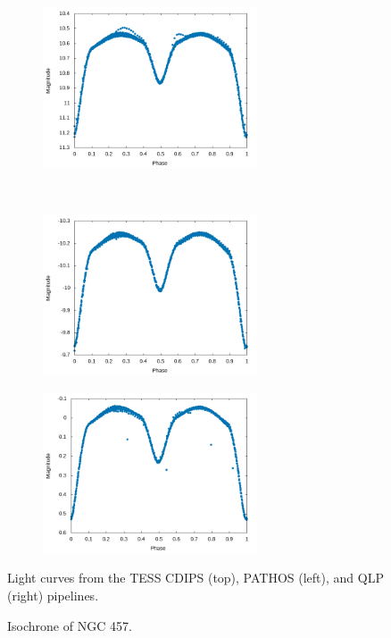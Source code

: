\documentclass[linenumbers]{aastex631}
\begin{document}
\begin{figure}[htb!]
  \centering
  \begin{subfigure}{}
    \includegraphics[width=2.5in]{Figures/V765Cas-TESS-CDIPS-Lightcurve.png}
  \end{subfigure} \\
  \begin{subfigure}{}
    \includegraphics[width=2.5in]{Figures/V765Cas-TESS-PATHOS-Lightcurve.png}
  \end{subfigure}
  \begin{subfigure}{}
    \includegraphics[width=2.5in]{Figures/V765Cas-TESS-QLP-Lightcurve.png}
  \end{subfigure}
  \caption{Light curves from the TESS CDIPS (top), PATHOS (left), and QLP (right) pipelines.}
  \label{fig:tesslightcurves}
\end{figure}

\begin{figure}[H]
\caption{Isochrone of NGC 457.} 
\label{fig:isochrone}
\end{figure}
\end{document}
